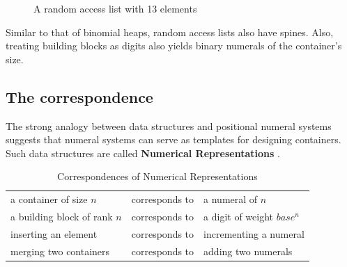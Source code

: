 \documentclass[\main/thesis.tex]{subfiles}
\begin{document}
\begin{figure}[H]
    \centering
\caption{A random access list with 13 elements}
\label{figure:5}
\end{figure}

Similar to that of binomial heaps, random access lists also have spines.
Also, treating building blocks as digits also yields binary numerals of the
container's size.

\subsection{The correspondence}

The strong analogy between data structures and positional numeral systems
suggests that numeral systems can serve as templates for designing containers.
Such data structures are called \textbf{Numerical Representations}\cite{okasaki1996purely}
\cite{hinze1998numerical}.

\begin{table}[H]
    \centering
    \begin{adjustbox}{max width=\textwidth}
    \begin{tabular}{ l l l }
    a container of size $ n $ & corresponds to & a numeral of $ n $ \\
    a building block of rank $ n $ & corresponds to & a digit of weight $ base^n $ \\
    inserting an element      & corresponds to & incrementing a numeral \\
    merging two containers    & corresponds to & adding two numerals \\
    \end{tabular}
    \end{adjustbox}
\caption{Correspondences of Numerical Representations}
\label{table:7}
\end{table}
\end{document}
